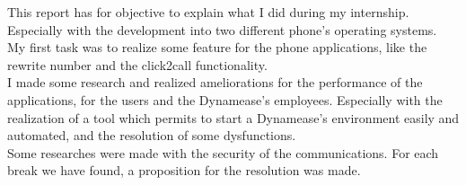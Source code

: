 This report has for objective to explain what I did during my internship. Especially with the development into two different phone's operating systems.\\

My first task was to realize some feature for the phone applications, like the rewrite number and the click2call functionality.\\

I made some research and realized ameliorations for the performance of the applications, for the users and the Dynamease's employees. Especially with the realization of a tool which permits to start a Dynamease's environment easily and automated, and the resolution of some dysfunctions.\\

Some researches were made with the security of the communications. For each break we have found, a proposition for the resolution was made.